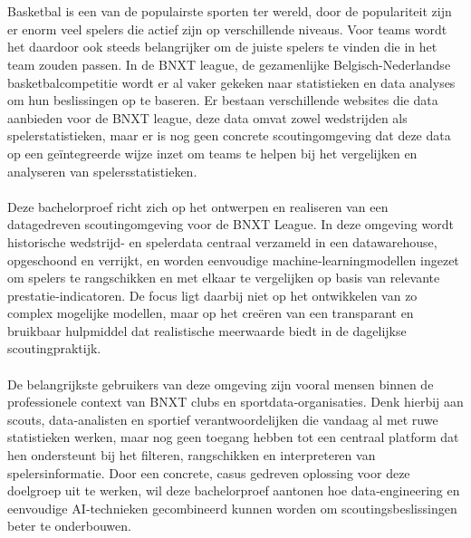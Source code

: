 
\chapter{}%
\label{ch:inleiding}

Basketbal is een van de populairste sporten ter wereld, door de populariteit zijn er enorm veel spelers die actief zijn op verschillende niveaus. Voor teams wordt het daardoor ook steeds belangrijker om de juiste spelers te vinden die in het team zouden passen. In de BNXT league, de gezamenlijke Belgisch-Nederlandse basketbalcompetitie wordt er al vaker gekeken naar statistieken en data analyses om hun beslissingen op te baseren. Er bestaan verschillende websites die data aanbieden voor de BNXT league, deze data omvat zowel wedstrijden als spelerstatistieken, maar er is nog geen concrete scoutingomgeving dat deze data op een geïntegreerde wijze inzet om teams te helpen bij het vergelijken en analyseren van spelersstatistieken.
\\
\\
Deze bachelorproef richt zich op het ontwerpen en realiseren van een datagedreven scoutingomgeving voor de BNXT League. In deze omgeving wordt historische wedstrijd- en spelerdata centraal verzameld in een datawarehouse, opgeschoond en verrijkt, en worden eenvoudige machine‑learningmodellen ingezet om spelers te rangschikken en met elkaar te vergelijken op basis van relevante prestatie‑indicatoren. De focus ligt daarbij niet op het ontwikkelen van zo complex mogelijke modellen, maar op het creëren van een transparant en bruikbaar hulpmiddel dat realistische meerwaarde biedt in de dagelijkse scoutingpraktijk.
\\
\\
De belangrijkste gebruikers van deze omgeving zijn vooral mensen binnen de professionele context van BNXT clubs en sportdata‑organisaties. Denk hierbij aan scouts, data‑analisten en sportief verantwoordelijken die vandaag al met ruwe statistieken werken, maar nog geen toegang hebben tot een centraal platform dat hen ondersteunt bij het filteren, rangschikken en interpreteren van spelersinformatie. Door een concrete, casus gedreven oplossing voor deze doelgroep uit te werken, wil deze bachelorproef aantonen hoe data‑engineering en eenvoudige AI‑technieken gecombineerd kunnen worden om scoutingsbeslissingen beter te onderbouwen.

